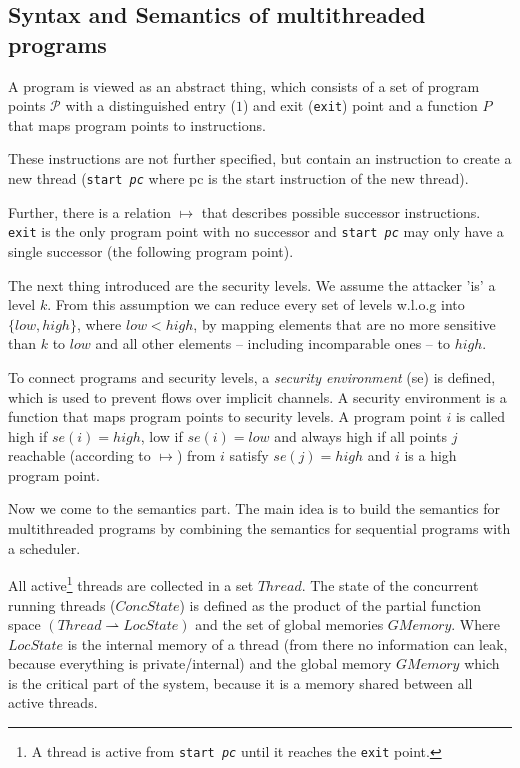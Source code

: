 \documentclass[a4paper,10pt]{llncs}
\begin{document}
\subsection{Syntax and Semantics of multithreaded programs}
\label{sec:syntaxsemantics}
A program is viewed as an abstract thing, which consists of a set of
program points $\mathcal{P}$ with a distinguished entry ($1$) and exit
(\texttt{exit}) point and a function $P$ that maps program points to
instructions.

These instructions are not further specified, but contain an instruction
to create a new thread (\texttt{start \textit{pc}} where pc is the start
instruction of the new thread).

Further, there is a relation $\mapsto$ that describes possible successor
instructions. \texttt{exit} is the only program point with no successor
and \texttt{start \textit{pc}} may only have a single successor (the
following program point).

The next thing introduced are the security levels. We assume the attacker
'is' a level $k$. From this assumption we can reduce every set of levels
w.l.o.g into $\{low, high\}$, where $low < high$, by mapping elements
that are no more sensitive than $k$ to $low$ and all other elements
-- including incomparable ones -- to $high$.

To connect programs and security levels, a \textit{security environment}
(se) is defined, which is used to prevent flows over implicit channels.
A security environment is a function that maps program points to security
levels. A program point $i$ is called high if $se(i) = high$, low if $se(i)
= low$ and always high if all points $j$ reachable (according to $\mapsto$)
from $i$ satisfy $se(j) = high$ and $i$ is a high program point.

Now we come to the semantics part. The main idea is to build the semantics
for multithreaded programs by combining the semantics for sequential programs
with a scheduler.

All active\footnote{A thread is active from \texttt{start \textit{pc}} until
it reaches the \texttt{exit} point.} threads are collected in a set $Thread$.
The state of the concurrent running threads ($ConcState$) is defined as the
product of the partial function space $(Thread \rightharpoonup LocState)$
and the set of global memories $GMemory$. Where $LocState$ is the internal
memory of a thread (from there no information can leak, because everything is private/internal) and the global memory $GMemory$ which is
the critical part of the system, because it is a memory shared between all
active threads.
\end{document}

